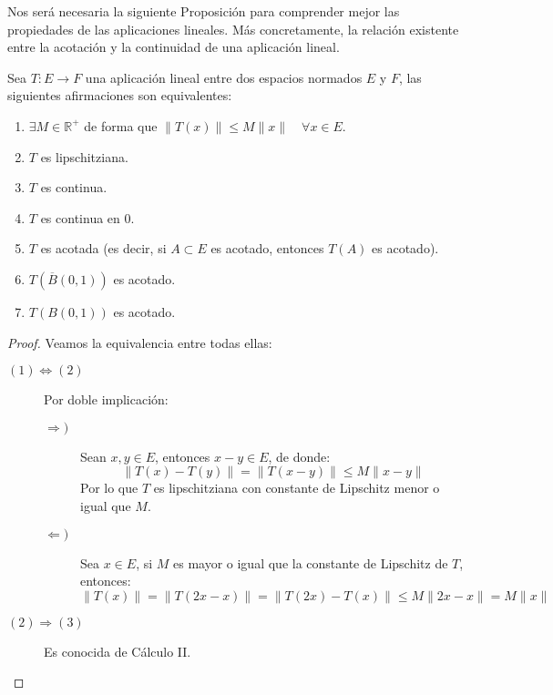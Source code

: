 \noindent
Nos será necesaria la siguiente Proposición para comprender mejor las propiedades de las aplicaciones lineales. Más concretamente, la relación existente entre la acotación y la continuidad de una aplicación lineal.
\begin{prop}\label{prop:lineal_continuidad_acotacion}
    Sea $T:E\to F$ una aplicación lineal entre dos espacios normados $E$ y $F$, las siguientes afirmaciones son equivalentes:
    \begin{enumerate}[label=(\arabic*)]
        \item $\exists M\in \mathbb{R}^+$ de forma que $\|T(x)\| \leq M\|x\| \quad \forall x\in E$.
        \item $T$ es lipschitziana.
        \item $T$ es continua.
        \item $T$ es continua en $0$.
        \item $T$ es acotada (es decir, si $A\subset E$ es acotado, entonces $T(A)$ es acotado).
        \item $T(\overline{B}(0,1))$  es acotado.
        \item $T(B(0,1))$  es acotado.
    \end{enumerate}
    \begin{proof}
        Veamos la equivalencia entre todas ellas:
        \begin{description}
            \item [$(1)\Longleftrightarrow (2)$]  Por doble implicación:
                \begin{description}
                    \item [$\Longrightarrow )$] Sean $x,y\in E$, entonces $x-y\in E$, de donde:
                        \begin{equation*}
                            \|T(x) - T(y)\| = \|T(x-y)\| \leq M\|x-y\|
                        \end{equation*}
                        Por lo que $T$ es lipschitziana con constante de Lipschitz menor o igual que $M$.
                    \item [$\Longleftarrow )$] Sea $x\in E$, si $M$ es mayor o igual que la constante de Lipschitz de $T$, entonces:
                        \begin{equation*}
                            \|T(x)\| = \|T(2x-x)\| = \|T(2x) - T(x)\| \leq M\|2x-x\| = M\|x\|
                        \end{equation*}
                \end{description}
            \item [$(2)\Longrightarrow (3)$] Es conocida de Cálculo II.

\end{description}
\end{proof}
\end{prop}

